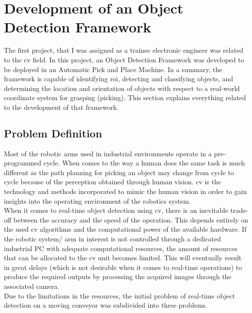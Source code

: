 \documentclass[a4paper,12pt]{report}
\begin{document}
\section{Development of an Object Detection Framework}
\label{Development of an Object Detection Framework}
The first project, that I was assigned as a trainee electronic engineer was related to the \ac{cv} field. In this project, an Object Detection Framework was developed to be deployed in an Automatic Pick and Place Machine. In a summary, the framework is capable of identifying \ac{roi}, detecting and classifying objects, and determining the location and orientation of objects with respect to a real-world coordinate system for grasping (picking). This section explains everything related to the development of that framework.


\subsection{Problem Definition}\label{Problem Definition}
Most of the robotic arms used in industrial environments operate in a pre-programmed cycle. When comes to the way a human does the same task is much different as the path planning for picking an object may change from cycle to cycle because of the perception obtained through human vision. \Ac{cv} is the technology and methods incorporated to mimic the human vision in order to gain insights into the operating environment of the robotics system.\\

When it comes to real-time object detection using \ac{cv}, there is an inevitable trade-off between the accuracy and the speed of the operation. This depends entirely on the used \ac{cv} algorithms and the computational power of the available hardware. If the robotic system/ arm in interest is not controlled through a dedicated industrial PC with adequate computational resources, the amount of resources that can be allocated to the \ac{cv} unit becomes limited.  This will eventually result in great delays (which is not desirable when it comes to real-time operations) to produce the required outputs by processing the acquired images through the associated camera.\\

Due to the limitations in the resources, the initial problem of real-time object detection on a moving conveyor was subdivided into three problems.
\end{document}
